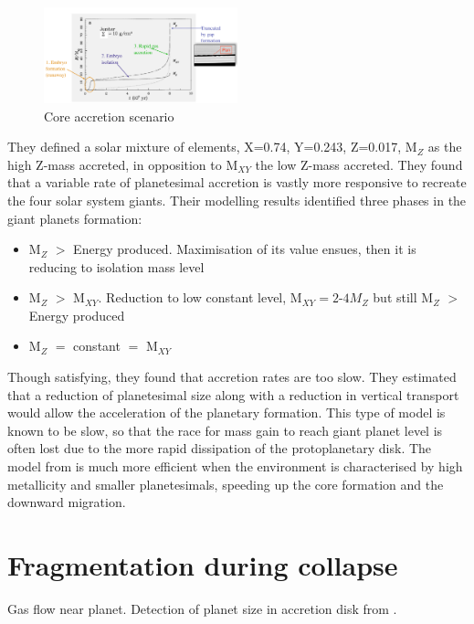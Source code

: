 \documentclass[12pt]{article} %
\begin{document}
\begin{figure}
\begin{center}
 \includegraphics[width=0.5\textwidth,keepaspectratio=true]{./images/pollack1996}
 \caption{Core accretion scenario \cite{pollack1996formation}}
 \label{pollack1996}
\end{center}
\end{figure}

\noindent They defined a solar mixture of elements, X=0.74, Y=0.243, Z=0.017, M$_Z$ as the high Z-mass accreted, in opposition to M$_{XY}$ the low Z-mass accreted. They found that a variable rate of planetesimal accretion \cite{lissauer1987timescales} is vastly more responsive to recreate the four solar system giants. Their modelling results identified three phases in the giant planets formation:

\begin{itemize}
\setlength\itemsep{0em}
\item M$_Z$ $>$ Energy produced. Maximisation of its value ensues, then it is reducing to isolation mass level
\item M$_Z$ $>$ M$_{XY}$. Reduction to low constant level, M$_{XY} = 2$-$4 M_Z$ but still M$_Z$ $>$ Energy produced
\item M$_Z$ $=$ constant $=$ M$_{XY}$
\end{itemize}

\noindent Though satisfying, they found that accretion rates are too slow. They estimated that a reduction of planetesimal size along with a reduction in vertical transport would allow the acceleration of the planetary formation. This type of model is known to be slow, so that the race for mass gain to reach giant planet level is often lost due to the more rapid dissipation of the protoplanetary disk. The model from \cite{pollack1996formation} is much more efficient when the environment is characterised by high metallicity and smaller planetesimals, speeding up the core formation and the downward migration.

\section{Fragmentation during collapse}\vspace{-2ex}\titlerule[1pt]\bigskip
Gas flow near planet. 
Detection of planet size in accretion disk from \cite{bate2003three}.\newline
\end{document}
